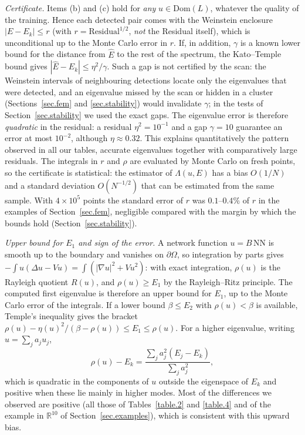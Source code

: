 \documentclass[10pt]{amsart}
\newenvironment{revblock}{\color{blue}}{}
\theoremstyle{definition}
\theoremstyle{remark}
\theoremstyle{plain}
\newcommand{\R}{\mathbb{R}}
\begin{document}
\begin{revblock}
\noindent\emph{Certificate.} Items (b) and (c) hold for \emph{any} $u\in \mathrm{Dom}(L)$, whatever the quality
of the training. Hence each detected pair comes with the Weinstein enclosure
$|E-E_k|\le r$ (with $r=\mathrm{Residual}^{1/2}$, \emph{not} the Residual itself), which is unconditional up
to the Monte Carlo error in $r$. If, in addition, $\gamma$ is a known
lower bound for the distance from $\hat E$ to the rest of the spectrum, the Kato--Temple bound gives
$|\hat E-E_k|\le\eta^2/\gamma$. Such a gap is not certified by the scan: the Weinstein intervals of
neighbouring detections locate only the eigenvalues that were detected, and an eigenvalue missed by
the scan or hidden in a cluster (Sections~\ref{sec.fem} and \ref{sec.stability}) would invalidate
$\gamma$; in the tests of Section~\ref{sec.stability} we used the exact gaps. The eigenvalue error is therefore
\emph{quadratic} in the residual: a residual $\eta^2=10^{-1}$ and a gap $\gamma=10$ guarantee an
error at most $10^{-2}$, although $\eta\approx0.32$. This explains quantitatively the pattern
observed in all our tables, accurate eigenvalues together with comparatively large residuals. The
integrals in $r$ and $\rho$ are evaluated by Monte Carlo on fresh points, so the certificate is
statistical: the estimator of $\Lambda(u,E)$ has a bias $O(1/N)$ and a standard deviation
$O(N^{-1/2})$ that can be estimated from the same sample. With $4\times10^5$ points the standard
error of $r$ was $0.1$--$0.4\%$ of $r$ in the examples of Section~\ref{sec.fem}, negligible compared
with the margin by which the bounds hold (Section~\ref{sec.stability}).

\noindent\emph{Upper bound for $E_1$ and sign of the error.} A network function $u=B\,\mathrm{NN}$ is
smooth up to the boundary and vanishes on $\partial\Omega$, so integration by parts gives
$-\int u(\Delta u-Vu)=\int(|\nabla u|^2+Vu^2)$: with exact integration, $\rho(u)$ is the Rayleigh
quotient $R(u)$, and $\rho(u)\ge E_1$ by the Rayleigh--Ritz principle. The computed first eigenvalue is
therefore an upper bound for $E_1$, up to the Monte Carlo error of the integrals. If a lower bound
$\beta\le E_2$ with $\rho(u)<\beta$ is available, Temple's inequality \cite{Kato1949} gives the bracket
$\rho(u)-\eta(u)^2/(\beta-\rho(u))\le E_1\le\rho(u)$. For a higher eigenvalue, writing $u=\sum_ja_ju_j$,
\[
\rho(u)-E_k=\frac{\sum_ja_j^2(E_j-E_k)}{\sum_ja_j^2},
\]
which is quadratic in the components of $u$ outside the eigenspace of $E_k$ and positive when these
lie mainly in higher modes. Most of the differences we observed are positive (all those of
Tables~\ref{table.2} and \ref{table.4} and of the example in $\R^{10}$ of Section~\ref{sec.examples}),
which is consistent with this upward bias.
\end{revblock}
\end{document}
